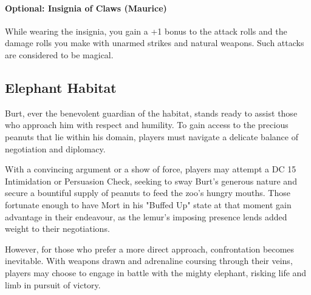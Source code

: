 \paragraph*{Optional: Insignia of Claws (Maurice)}
While wearing the insignia, you gain a +1 bonus to the attack rolls and the damage rolls you make with unarmed strikes and natural weapons. Such attacks are considered to be magical.

\hfill\eject
\subsection*{ Elephant Habitat}
Burt, ever the benevolent guardian of the habitat, stands ready to assist those who approach him with respect and humility. To gain access to the precious peanuts that lie within his domain, players must navigate a delicate balance of negotiation and diplomacy.

With a convincing argument or a show of force, players may attempt a DC 15 Intimidation or Persuasion Check, seeking to sway Burt's generous nature and secure a bountiful supply of peanuts to feed the zoo's hungry mouths. Those fortunate enough to have Mort in his "Buffed Up" state at that moment gain advantage in their endeavour, as the lemur's imposing presence lends added weight to their negotiations.

However, for those who prefer a more direct approach, confrontation becomes inevitable. With weapons drawn and adrenaline coursing through their veins, players may choose to engage in battle with the mighty elephant, risking life and limb in pursuit of victory.

